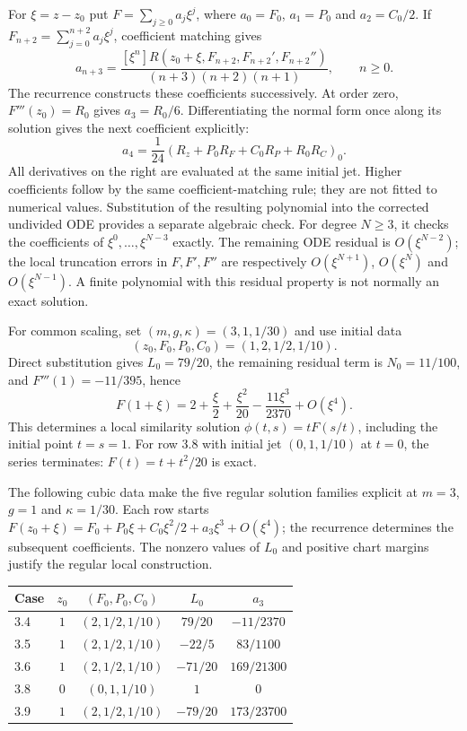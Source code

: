 \documentclass[11pt]{article}
\theoremstyle{definition}
\begin{document}
For $\xi=z-z_0$ put $F=\sum_{j\geq0}a_j\xi^j$, where
$a_0=F_0$, $a_1=P_0$ and $a_2=C_0/2$. If
$F_{n+2}=\sum_{j=0}^{n+2}a_j\xi^j$, coefficient matching gives
\begin{equation}
 a_{n+3}=
 \frac{[\xi^n]R(z_0+\xi,F_{n+2},F_{n+2}',F_{n+2}'')}
 {(n+3)(n+2)(n+1)},\qquad n\geq0.
 \label{eq:sve-series-recurrence}
\end{equation}
The recurrence constructs these coefficients successively. At order zero,
$F'''(z_0)=R_0$ gives $a_3=R_0/6$. Differentiating the normal form once
along its solution gives the next coefficient explicitly:
\[
 a_4=\frac1{24}\left(R_z+P_0R_F+C_0R_P+R_0R_C\right)_0.
\]
All derivatives on the right are evaluated at the same initial jet. Higher
coefficients follow by the same coefficient-matching rule; they are not
fitted to numerical values. Substitution of the resulting polynomial into
the corrected undivided ODE provides a separate algebraic check. For degree $N\geq3$, it checks the coefficients of
$\xi^0,\ldots,\xi^{N-3}$ exactly. The remaining ODE residual is
$O(\xi^{N-2})$; the local truncation errors in $F,F',F''$ are respectively
$O(\xi^{N+1})$, $O(\xi^N)$ and $O(\xi^{N-1})$. A finite polynomial with
this residual property is not normally an exact solution.

For common scaling, set $(m,g,\kappa)=(3,1,1/30)$ and use initial data
\[
 (z_0,F_0,P_0,C_0)=(1,2,1/2,1/10).
\]
Direct substitution gives
$L_0=79/20$, the remaining residual term is $N_0=11/100$, and $F'''(1)=-11/395$, hence
\[
 F(1+\xi)=2+\frac{\xi}{2}+\frac{\xi^2}{20}
             -\frac{11\xi^3}{2370}+O(\xi^4).
\]
This determines a local similarity solution $\phi(t,s)=tF(s/t)$, including
the initial point $t=s=1$. For row 3.8 with initial jet $(0,1,1/10)$ at
$t=0$, the series terminates: $F(t)=t+t^2/20$ is exact.

The following cubic data make the five regular solution families explicit
at $m=3$, $g=1$ and $\kappa=1/30$. Each row starts
$F(z_0+\xi)=F_0+P_0\xi+C_0\xi^2/2+a_3\xi^3+O(\xi^4)$;
the recurrence determines the subsequent coefficients. The nonzero values
of $L_0$ and positive chart margins justify the regular local construction.
\begin{center}\small
\begin{tabular}{@{}lcccc@{}}
\toprule
Case & $z_0$ & $(F_0,P_0,C_0)$ & $L_0$ & $a_3$\\
\midrule
3.4 & $1$ & $(2,1/2,1/10)$ & $79/20$ & $-11/2370$\\
3.5 & $1$ & $(2,1/2,1/10)$ & $-22/5$ & $83/1100$\\
3.6 & $1$ & $(2,1/2,1/10)$ & $-71/20$ & $169/21300$\\
3.8 & $0$ & $(0,1,1/10)$ & $1$ & $0$\\
3.9 & $1$ & $(2,1/2,1/10)$ & $-79/20$ & $173/23700$\\
\bottomrule
\end{tabular}
\end{center}
\end{document}
